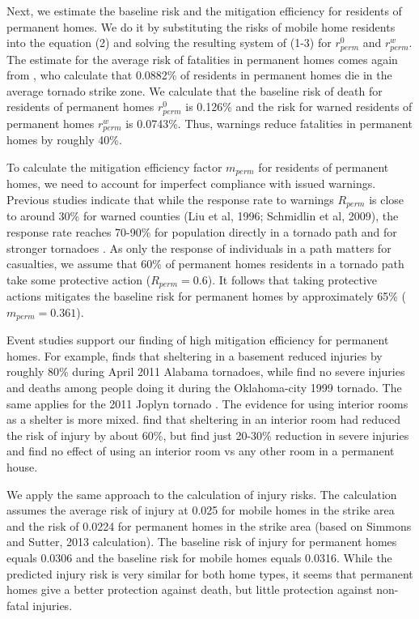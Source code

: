 \documentclass{ametsocV6.1}
\begin{document}
Next, we estimate the baseline risk and the mitigation efficiency for residents of permanent homes. We do it by substituting the risks of mobile home residents into the equation (2) and solving the resulting system of (1-3) for $r_{perm}^0$ and $r_{perm}^w$. The estimate for the average risk of fatalities in permanent homes comes again from \citet{simmons_economic_2013}, who calculate that 0.0882\% of residents in permanent homes die in the average tornado strike zone. We calculate that the baseline risk of death for residents of permanent homes $r_{perm}^0$ is 0.126\% and the risk for warned residents of permanent homes $r_{perm}^w$ is 0.0743\%. Thus, warnings reduce fatalities in permanent homes by roughly 40\%. 

To calculate the mitigation efficiency factor $m_{perm}$ for residents of permanent homes, we need to account for imperfect compliance with issued warnings. Previous studies indicate that while the response rate to warnings $R_{perm}$ is close to around 30\% for warned counties (Liu et al, 1996; Schmidlin et al, 2009), the response rate reaches 70-90\% for population directly in a tornado path and for stronger tornadoes \citep*{klockow_investigation_2011, paul_predictors_2015}. As only the response of individuals in a path matters for casualties, we assume that 60\% of permanent homes residents in a tornado path take some protective action ($R_{perm}=0.6$). It follows that taking protective actions mitigates the baseline risk for permanent homes by approximately 65\% ($m_{perm}=0.361$). 

Event studies support our finding of high mitigation efficiency for permanent homes. For example, \citet{niederkrotenthaler_injuries_2013} finds that sheltering in a basement reduced injuries by roughly 80\% during April 2011 Alabama tornadoes, while \citet{daley_risk_2005} find no severe injuries and deaths among people doing it during the Oklahoma-city 1999 tornado. The same applies for the 2011 Joplyn tornado \citep*{paul_predictors_2015}. The evidence for using interior rooms as a shelter is more mixed. \citet{niederkrotenthaler_injuries_2013} find that sheltering in an interior room had reduced the risk of injury by about 60\%, but \citet{daley_risk_2005} find just 20-30\% reduction in severe injuries and \citet{hammer_response_2002} find no effect of using an interior room vs any other room in a permanent house.

We apply the same approach to the calculation of injury risks. The calculation assumes the average risk of injury at 0.025 for mobile homes in the strike area and the risk of 0.0224 for permanent homes in the strike area (based on Simmons and Sutter, 2013 calculation). The baseline risk of injury for permanent homes equals 0.0306 and the baseline risk for mobile homes equals 0.0316. While the predicted injury risk is very similar for both home types, it seems that permanent homes give a better protection against death, but little protection against non-fatal injuries.
\end{document}
